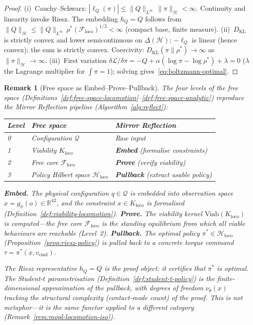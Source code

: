 \documentclass[11pt,a4paper]{article}
\newtheorem{remark}[theorem]{Remark}
\newcommand{\R}{\mathbb{R}}
\newcommand{\cL}{\mathcal{L}}
\newcommand{\cF}{\mathcal{F}}
\newcommand{\cH}{\mathcal{H}}
\newcommand{\DKL}{D_{\mathrm{KL}}}
\begin{document}
\begin{proof}
(i)~Cauchy--Schwarz:
$|\ell_Q(\pi)|
  \leq \|Q\|_{L^\infty}\,\|\pi\|_\cH < \infty$.
Continuity and linearity invoke Riesz.
The embedding $h_Q = Q$ follows from
$\|Q\|_\cH \leq \|Q\|_{L^\infty}\,\rho^*(\cF_{\mathrm{loco}})^{1/2} < \infty$
(compact base, finite measure).
(ii)~$\DKL$ is strictly convex
and lower semicontinuous on $\Delta(\cH)$;
$-\ell_Q$ is linear (hence convex);
the sum is strictly convex.
Coercivity: $\DKL(\pi \| \rho^*) \to \infty$
as $\|\pi\|_\cH \to \infty$.
(iii)~First variation
$\delta\cL/\delta\pi
  = -Q + \alpha(\log\pi - \log\rho^*) + \lambda = 0$
($\lambda$ the Lagrange multiplier for $\int\pi = 1$);
solving gives~\eqref{eq:boltzmann-optimal}.
\end{proof}

\begin{remark}[Free space as Embed--Prove--Pullback]
\label{rem:free-space-epp}
The four levels of the free space
(Definitions~\ref{def:free-space-locomotion}--\ref{def:free-space-analytic})
reproduce the Mirror Reflection pipeline
(Algorithm~\ref{alg:reflect}):

\smallskip
\begin{center}
\begin{tabular}{@{}lll@{}}
\toprule
\textbf{Level} & \textbf{Free space}
  & \textbf{Mirror Reflection} \\
\midrule
0 & Configuration $\mathcal{Q}$
  & Raw input \\
1 & Viability $K_{\mathrm{loco}}$
  & \textbf{Embed} (formalise constraints) \\
2 & Free core $\cF_{\mathrm{loco}}$
  & \textbf{Prove} (verify viability) \\
3 & Policy Hilbert space $\cH_{\mathrm{loco}}$
  & \textbf{Pullback} (extract usable policy) \\
\bottomrule
\end{tabular}
\end{center}

\smallskip\noindent
\textbf{Embed.}\;
The physical configuration
$q \in \mathcal{Q}$
is embedded into observation space
$x = g_\phi(o) \in \R^{42}$,
and the constraint
$x \in K_{\mathrm{loco}}$
is formalised
(Definition~\ref{def:viability-locomotion}).
\textbf{Prove.}\;
The viability kernel
$\mathrm{Viab}(K_{\mathrm{loco}})$
is computed---the free core
$\cF_{\mathrm{loco}}$ is the standing equilibrium
from which all viable behaviours are reachable
(Level~2).
\textbf{Pullback.}\;
The optimal policy
$\pi^* \in \cH_{\mathrm{loco}}$
(Proposition~\ref{prop:riesz-policy})
is pulled back to a concrete torque command
$\tau = \pi^*(x, v_{\mathrm{cmd}})$.

\medskip\noindent
The Riesz representative
$h_Q = Q$
is the \emph{proof object}:
it certifies that $\pi^*$ is optimal.
The Student-$t$ parametrisation
(Definition~\ref{def:student-t-policy})
is the finite-dimensional
approximation of the pullback,
with degrees of freedom
$\nu_\theta(x)$
tracking the structural complexity
(contact-mode count) of the proof.
This is not metaphor---it is the
same functor applied to a different category
(Remark~\ref{rem:mopl-locomotion-iso}).
\end{remark}
\end{document}
